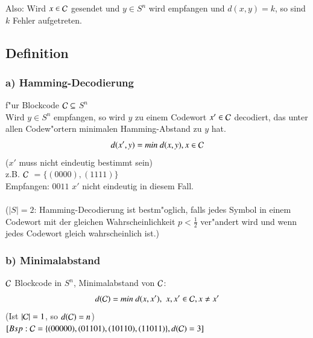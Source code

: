 \noindent Also: Wird $x \in \mathcal{C}$ gesendet und $y \in S^n$ wird empfangen und $d(x,y)=k$, so sind $k$ Fehler aufgetreten.
\subsection{Definition}
\subsubsection{a) Hamming-Decodierung}
f"ur Blockcode $\mathcal{C} \subseteq$ $S^n$ \\
Wird $y \in S^n$ empfangen, so wird $y$ zu einem Codewort $x' \in \mathcal{C}$ decodiert, das unter allen Codew"ortern minimalen Hamming-Abstand zu $y$ hat.
\[
	d(x',y)=min\  d(x,y), x \in \mathcal{C}
\]
($x'$ muss nicht eindeutig bestimmt sein)\\
z.B. $\mathcal{C}$ $ = \{ (0000), (1111) \}$\\
Empfangen: $0011$ $x'$ nicht eindeutig in diesem Fall.\\
\\
($\left| S \right | = 2$: Hamming-Decodierung ist bestm"oglich, falls jedes Symbol in einem Codewort mit der gleichen Wahrscheinlichkeit $p < \frac{1}{2}$ ver"andert wird und wenn jedes Codewort gleich wahrscheinlich ist.)

\subsubsection{b) Minimalabstand}
$\mathcal{C}$ Blockcode in $S^n$, Minimalabstand von $\mathcal{C}$:
\[
	d(\mathcal{C}) = min \  d(x,x')\mathbf{,}\ \  x,x' \in \mathcal{C}, x \neq x'
\]
(Ist $\left| \mathcal{C} \right| = 1$, so $d(\mathcal{C})=n$)\\
$[Bsp: \mathcal{C} = \lbrace (00000),(01101),(10110),(11011) \rbrace , d(\mathcal{C})=3]$

